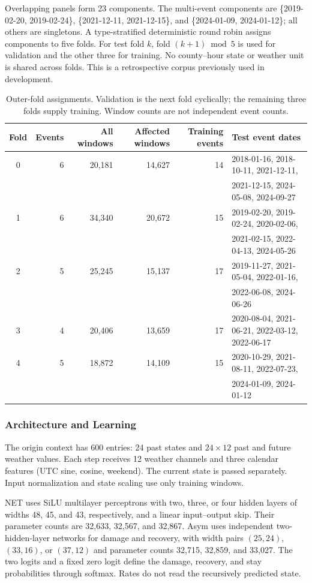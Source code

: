 Overlapping panels form 23 components. The multi-event components are \{2019-02-20, 2019-02-24\}, \{2021-12-11, 2021-12-15\}, and \{2024-01-09, 2024-01-12\}; all others are singletons. A type-stratified deterministic round robin assigns components to five folds. For test fold $k$, fold $(k+1)\bmod5$ is used for validation and the other three for training. No county--hour state or weather unit is shared across folds. This is a retrospective corpus previously used in development.

\begin{table}[htbp]
\centering\small
\caption{Outer-fold assignments. Validation is the next fold cyclically; the remaining three folds supply training. Window counts are not independent event counts.}
\label{tab:cvfolds}
\begin{tabular}{@{}crrrrl@{}}\toprule
Fold & Events & All windows & Affected windows & Training events & Test event dates\\\midrule
0 & 6 & 20,181 & 14,627 & 14 & 2018-01-16, 2018-10-11, 2021-12-11,\\
  & & & & & 2021-12-15, 2024-05-08, 2024-09-27\\
1 & 6 & 34,340 & 20,672 & 15 & 2019-02-20, 2019-02-24, 2020-02-06,\\
  & & & & & 2021-02-15, 2022-04-13, 2024-05-26\\
2 & 5 & 25,245 & 15,137 & 17 & 2019-11-27, 2021-05-04, 2022-01-16,\\
  & & & & & 2022-06-08, 2024-06-26\\
3 & 4 & 20,406 & 13,659 & 17 & 2020-08-04, 2021-06-21, 2022-03-12, 2022-06-17\\
4 & 5 & 18,872 & 14,109 & 15 & 2020-10-29, 2021-08-11, 2022-07-23,\\
  & & & & & 2024-01-09, 2024-01-12\\\bottomrule
\end{tabular}
\end{table}

\subsubsection{Architecture and Learning}
The origin context has 600 entries: 24 past states and $24\times12$ past and future weather values. Each step receives 12 weather channels and three calendar features (UTC sine, cosine, weekend). The current state is passed separately. Input normalization and state scaling use only training windows.

NET uses SiLU multilayer perceptrons with two, three, or four hidden layers of widths 48, 45, and 43, respectively, and a linear input--output skip. Their parameter counts are 32,633, 32,567, and 32,867. Asym uses independent two-hidden-layer networks for damage and recovery, with width pairs $(25,24)$, $(33,16)$, or $(37,12)$ and parameter counts 32,715, 32,859, and 33,027. The two logits and a fixed zero logit define the damage, recovery, and stay probabilities through softmax. Rates do not read the recursively predicted state.

